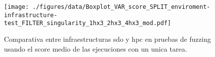 
\begin{figure*}[ht!]
    \centerline{
    \texttt{[image: ./figures/data/Boxplot\_VAR\_score\_SPLIT\_enviroment-infrastructure-test\_FILTER\_singularity\_1hx3\_2hx3\_4hx3\_mod.pdf]}    }
    \caption{Comparativa entre infraestructuras sdo y hpc en pruebas de fuzzing usando el score medio de las ejecuciones con un unica tarea.}
    \label{fig:Boxplot_score_by_infra-test-unique}
\end{figure*}